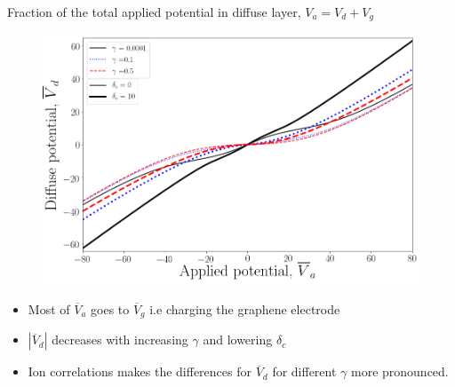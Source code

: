 \documentclass{beamer}
\begin{document}
\begin{frame}{Fraction of the total applied potential in diffuse layer, $V_a=V_d+V_g$}
    \begin{figure}[!h]
    \begin{center}
    \includegraphics[scale=0.15]{figure_4.png}
    \end{center}
\end{figure}
\begin{itemize}
    \item Most of $\overline{V}_a$ goes to $\overline{V}_g$ i.e charging the graphene electrode
    \item $|\overline{V}_d|$ decreases with increasing $\gamma$ and lowering $\delta_c$
    \item Ion correlations makes the differences for $\overline{V}_d$ for different $\gamma$ more pronounced.
\end{itemize}{}
\end{frame}{}
\end{document}
